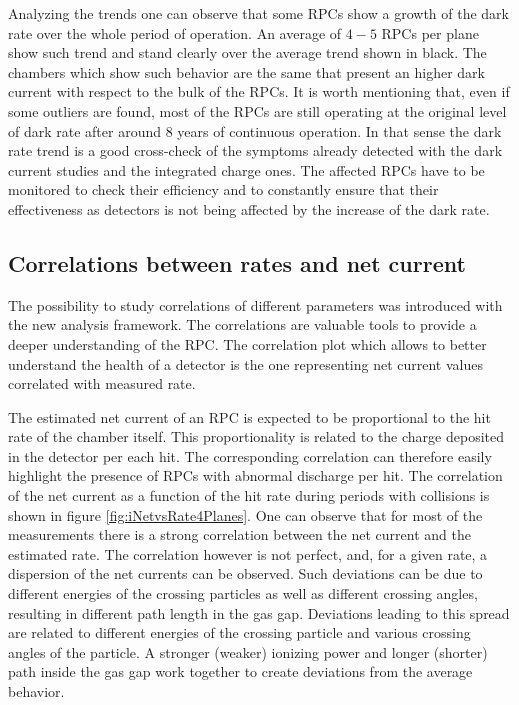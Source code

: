 Analyzing the trends one can observe that some RPCs show a growth of the dark rate over the whole period of operation.
An average of $4-5$ RPCs per plane show such trend and stand clearly over the average trend shown in black.
The chambers which show such behavior are the same that present an higher dark current with respect to the bulk of the RPCs.
It is worth mentioning that, even if some outliers are found, most of the RPCs are still operating at the original level of dark rate after around 8 years of continuous operation.
In that sense the dark rate trend is a good cross-check of the symptoms already detected with the dark current studies and the integrated charge ones.
The affected RPCs have to be monitored to check their efficiency and to constantly ensure that their effectiveness as detectors is not being affected by the increase of the dark rate.

\subsection{Correlations between rates and net current}
The possibility to study correlations of different parameters was introduced with the new analysis framework.
The correlations are valuable tools to provide a deeper understanding of the RPC.
The correlation plot which allows to better understand the health of a detector is the one representing net current values correlated with measured rate.

The estimated net current of an RPC is expected to be proportional to the hit rate of the chamber itself.
This proportionality is related to the charge deposited in the detector per each hit.
The corresponding correlation can therefore easily highlight the presence of RPCs with abnormal discharge per hit.
The correlation of the net current as a function of the hit rate during periods with collisions is shown in figure \ref{fig:iNetvsRate4Planes}.
One can observe that for most of the measurements there is a strong correlation between the net current and the estimated rate. 
The correlation however is not perfect, and, for a given rate, a dispersion of the net currents can be observed.
Such deviations can be due to different energies of the crossing particles as well as different crossing angles, resulting in different path length in the gas gap.
Deviations leading to this spread are related to different energies of the crossing particle and various crossing angles of the particle.
A stronger (weaker) ionizing power and longer (shorter) path inside the gas gap work together to create deviations from the average behavior.

